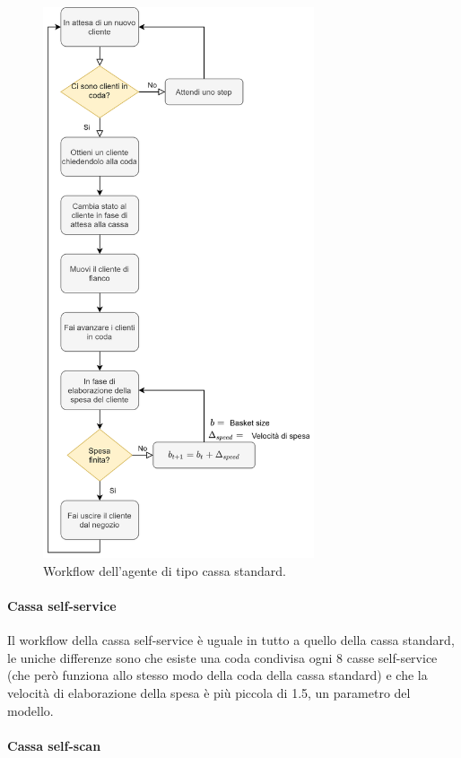 \begin{figure}[H]
	\centering
	\includegraphics[width=8cm]{"images/workflow_cashdesk_standard.png"}
	\caption{Workflow dell'agente di tipo cassa standard.}
	\label{fig:workflow_cashdesk_standard}
\end{figure}

\paragraph{Cassa self-service}

Il workflow della cassa self-service è uguale in tutto a quello della cassa standard, le uniche differenze sono che esiste una coda condivisa ogni 8 casse self-service (che però funziona allo stesso modo della coda della cassa standard) e che la velocità di elaborazione della spesa è più piccola di 1.5, un parametro del modello.

\paragraph{Cassa self-scan}


